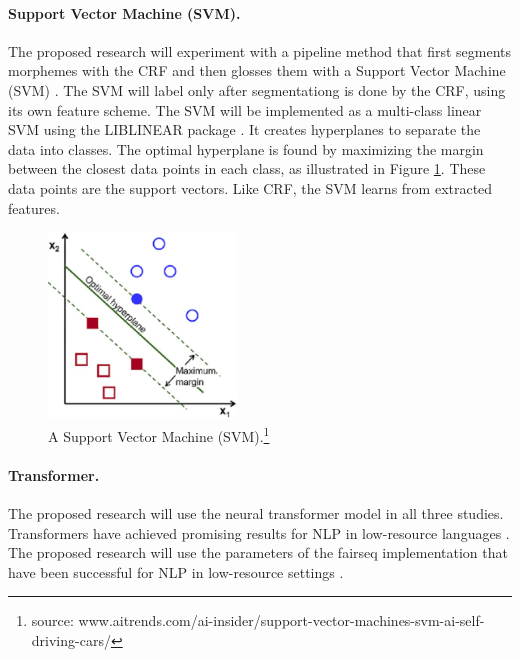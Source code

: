 \paragraph{Support Vector Machine (SVM).} The proposed research will experiment with a pipeline method that first segments morphemes with the CRF and then glosses them with a Support Vector Machine (SVM) \citep{svm_cortes}. The SVM will label only after segmentationg is done by the CRF, using its own feature scheme. The SVM will be implemented as a multi-class linear SVM using the LIBLINEAR package \citep{fan2008}. It creates hyperplanes to separate the data into classes. The optimal hyperplane is found by maximizing the margin between the closest data points in each class, as illustrated in Figure \ref{fig:SVM}. These data points are the support vectors. Like CRF, the SVM learns from extracted features.


\begin{figure}
    \centering
    \includegraphics[width=5cm]{figs/SVM1.jpg}
    \caption[Support Vector Machine]{A Support Vector Machine (SVM).\footnote{source: www.aitrends.com/ai-insider/support-vector-machines-svm-ai-self-driving-cars/}}
    \label{fig:SVM}
\end{figure}

\paragraph{Transformer.} The proposed research will use the neural transformer model \citep{vaswani_attention_2017} in all three studies. Transformers have achieved promising results for NLP in low-resource languages \citep{abbott_towards_2018,Martinus2019AFO}. 
The proposed research will use the parameters of the fairseq \citep{ott2019fairseq} implementation that have been successful for NLP in low-resource settings \citep{wu2020applying}.

